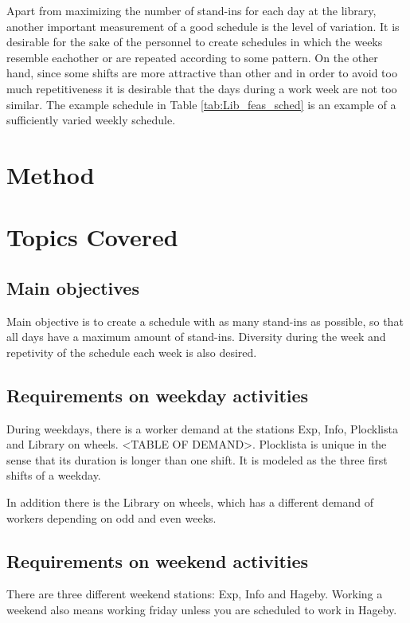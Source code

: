 Apart from maximizing the number of stand-ins for each day at the library, another important measurement of a good schedule is the level of variation. It is desirable for the sake of the personnel to create schedules in which the weeks resemble eachother or are repeated according to some pattern. On the other hand, since some shifts are more attractive than other and in order to avoid too much repetitiveness it is desirable that the days during a work week are not too similar. The example schedule in Table \ref{tab:Lib_feas_sched} is an example of a sufficiently varied weekly schedule. 

\section{Method}



\section{Topics Covered}













\iffalse
\subsection{Main objectives}
Main objective is to create a schedule with as many stand-ins as possible, so that all days have a maximum amount of stand-ins. Diversity during the week and repetivity of the schedule each week is also desired.

\subsection{Requirements on weekday activities}
During weekdays, there is a worker demand at the stations Exp, Info, Plocklista and Library on wheels. <TABLE OF DEMAND>. Plocklista is unique in the sense that its duration is longer than one shift. It is modeled as the three first shifts of a weekday.

In addition there is the Library on wheels, which has a different demand of workers depending on odd and even weeks. 
\subsection{Requirements on weekend activities}
There are three different weekend stations: Exp, Info and Hageby. Working a weekend also means working friday unless you are scheduled to work in Hageby. 
